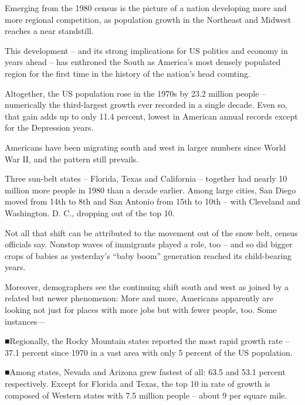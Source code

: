 \documentclass[a4paper]{article}
\begin{document}
\par
Emerging from the 1980 census is the picture of a nation developing more and more regional competition, as population growth in the Northeast and Midwest reaches a near standstill.

\par
This development -- and its strong implications for US politics and economy in years ahead -- has enthroned the South as America’s most densely populated region for the first time in the history of the nation’s head counting.

\par
Altogether, the US population rose in the 1970s by 23.2 million people -- numerically the third-largest growth ever recorded in a single decade. Even so, that gain adds up to only 11.4 percent, lowest in American annual records except for the Depression years.

\par
Americans have been migrating south and west in larger numbers since World War II, and the pattern still prevails.

\par
Three sun-belt states -- Florida, Texas and California -- together had nearly 10 million more people in 1980 than a decade earlier. Among large cities, San Diego moved from 14th to 8th and San Antonio from 15th to 10th -- with Cleveland and Washington. D. C., dropping out of the top 10.

\par
Not all that shift can be attributed to the movement out of the snow belt, census officials say. Nonstop waves of immigrants played a role, too -- and so did bigger crops of babies as yesterday’s “baby boom” generation reached its child-bearing years.

\par
Moreover, demographers see the continuing shift south and west as joined by a related but newer phenomenon: More and more, Americans apparently are looking not just for places with more jobs but with fewer people, too. Some instances—

\par
■Regionally, the Rocky Mountain states reported the most rapid growth rate -- 37.1 percent since 1970 in a vast area with only 5 percent of the US population.

\par
■Among states, Nevada and Arizona grew fastest of all: 63.5 and 53.1 percent respectively. Except for Florida and Texas, the top 10 in rate of growth is composed of Western states with 7.5 million people -- about 9 per square mile.
\end{document}
